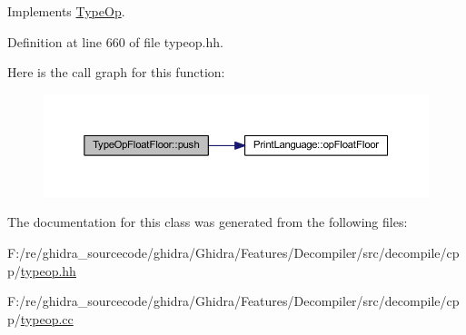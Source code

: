 Implements \mbox{\hyperlink{class_type_op_ac9c9544203ed74dabe6ac662b653b2af}{Type\+Op}}.



Definition at line 660 of file typeop.\+hh.

Here is the call graph for this function\+:
\nopagebreak
\begin{figure}[H]
\begin{center}
\leavevmode
\includegraphics[width=350pt]{class_type_op_float_floor_ab361c274c7e25f09ebe16562fe012f24_cgraph}
\end{center}
\end{figure}


The documentation for this class was generated from the following files\+:\begin{DoxyCompactItemize}
\item 
F\+:/re/ghidra\+\_\+sourcecode/ghidra/\+Ghidra/\+Features/\+Decompiler/src/decompile/cpp/\mbox{\hyperlink{typeop_8hh}{typeop.\+hh}}\item 
F\+:/re/ghidra\+\_\+sourcecode/ghidra/\+Ghidra/\+Features/\+Decompiler/src/decompile/cpp/\mbox{\hyperlink{typeop_8cc}{typeop.\+cc}}\end{DoxyCompactItemize}
